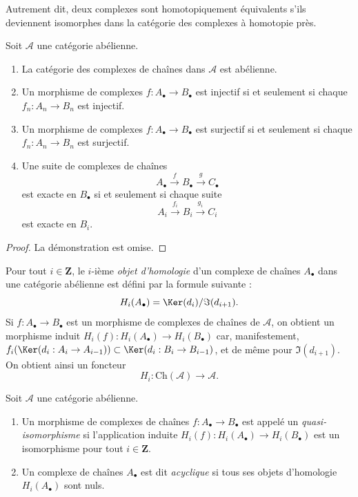 \noindent
Autrement dit, deux complexes sont homotopiquement équivalents s'ils deviennent
isomorphes dans la catégorie des complexes à homotopie près.

\begin{lemma}
\label{lemma-cat-chain-abelian}
Soit $\mathcal{A}$ une catégorie abélienne.
\begin{enumerate}
\item La catégorie des complexes de chaînes dans $\mathcal{A}$ est
abélienne.
\item Un morphisme de complexes
$f : A_\bullet \to B_\bullet$ est injectif
si et seulement si chaque $f_n : A_n \to B_n$ est injectif.
\item Un morphisme de complexes
$f : A_\bullet \to B_\bullet$ est surjectif
si et seulement si chaque $f_n : A_n \to B_n$ est surjectif.
\item Une suite de complexes de chaînes
$$
A_\bullet \xrightarrow{f} B_\bullet \xrightarrow{g} C_\bullet
$$
est exacte en $B_\bullet$ si et seulement si chaque suite
$$
A_i \xrightarrow{f_i} B_i \xrightarrow{g_i} C_i
$$
est exacte en $B_i$.
\end{enumerate}
\end{lemma}

\begin{proof}
La démonstration est omise.
\end{proof}

\noindent
Pour tout $i \in \mathbf{Z}$, le $i$-ième {\it objet d'homologie}
d'un complexe de chaînes $A_\bullet$ dans une catégorie abélienne est défini par
la formule suivante :
$$
H_i(A_\bullet) = \Ker(d_i)/\Im(d_{i + 1}).
$$
Si $f : A_\bullet \to B_\bullet$ est un morphisme de complexes de chaînes
de $\mathcal{A}$, on obtient un morphisme induit
$H_i(f) : H_i(A_\bullet) \to H_i(B_\bullet)$
car, manifestement,
$f_i(\Ker(d_i : A_i \to A_{i - 1})) \subset
\Ker(d_i : B_i \to B_{i - 1})$, et de même
pour $\Im(d_{i + 1})$.
On obtient ainsi un foncteur
$$
H_i : \text{Ch}(\mathcal{A}) \longrightarrow \mathcal{A}.
$$

\begin{definition}
\label{definition-quasi-isomorphism}
Soit $\mathcal{A}$ une catégorie abélienne.
\begin{enumerate}
\item Un morphisme de complexes de chaînes $f : A_\bullet \to B_\bullet$
est appelé un {\it quasi-isomorphisme} si l'application induite
$H_i(f) : H_i(A_\bullet) \to H_i(B_\bullet)$
est un isomorphisme pour tout $i \in \mathbf{Z}$.
\item Un complexe de chaînes $A_\bullet$ est dit
{\it acyclique} si tous ses objets d'homologie
$H_i(A_\bullet)$ sont nuls.
\end{enumerate}
\end{definition}



